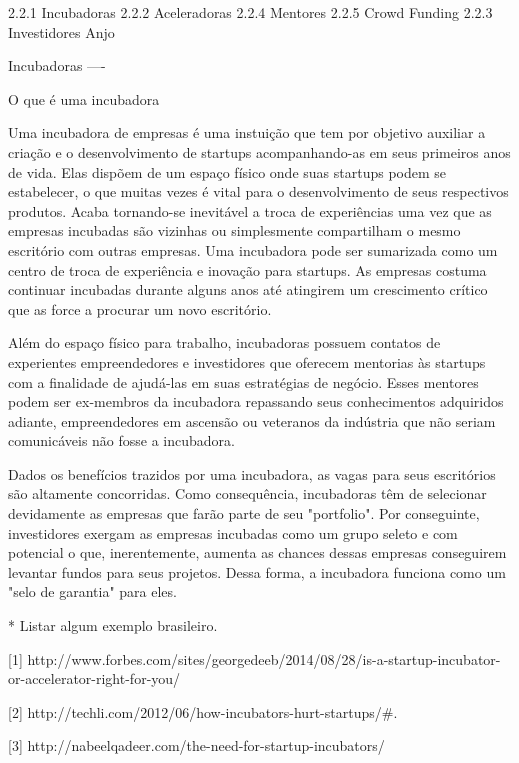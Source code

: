 2.2.1 Incubadoras
2.2.2 Aceleradoras
2.2.4 Mentores
2.2.5 Crowd Funding
2.2.3 Investidores Anjo

Incubadoras
----

O que é uma incubadora

Uma incubadora de empresas é uma instuição que tem por objetivo auxiliar a criação e o desenvolvimento de startups acompanhando-as em seus primeiros anos de vida. Elas dispõem de um espaço físico onde suas startups podem se estabelecer, o que muitas vezes é vital para o desenvolvimento de seus respectivos produtos. Acaba tornando-se inevitável a troca de experiências uma vez que as empresas incubadas são vizinhas ou simplesmente compartilham o mesmo escritório com outras empresas. Uma incubadora pode ser sumarizada como um centro de troca de experiência e inovação para startups. As empresas costuma continuar incubadas durante alguns anos até atingirem um crescimento crítico que as force a procurar um novo escritório.

Além do espaço físico para trabalho, incubadoras possuem contatos de experientes empreendedores e investidores que oferecem mentorias às startups com a finalidade de ajudá-las em suas estratégias de negócio. Esses mentores podem ser ex-membros da incubadora repassando seus conhecimentos adquiridos adiante, empreendedores em ascensão ou veteranos da indústria que não seriam comunicáveis não fosse a incubadora.

Dados os benefícios trazidos por uma incubadora, as vagas para seus escritórios são altamente concorridas. Como consequência, incubadoras têm de selecionar devidamente as empresas que farão parte de seu "portfolio". Por conseguinte, investidores exergam as empresas incubadas como um grupo seleto e com potencial o que, inerentemente, aumenta as chances dessas empresas conseguirem levantar fundos para seus projetos. Dessa forma, a incubadora funciona como um "selo de garantia" para eles.

* Listar algum exemplo brasileiro.

[1]
http://www.forbes.com/sites/georgedeeb/2014/08/28/is-a-startup-incubator-or-accelerator-right-for-you/

[2]
http://techli.com/2012/06/how-incubators-hurt-startups/#.

[3]
http://nabeelqadeer.com/the-need-for-startup-incubators/
